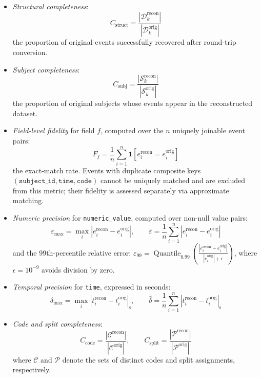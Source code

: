 \begin{itemize}
	
	\item \emph{Structural completeness}:
	\[
	C_{\text{struct}} = \frac{|\mathcal{D}_k^{\text{recon}}|}{|\mathcal{D}_k^{\text{orig}}|}
	\]
	the proportion of original events successfully recovered after round-trip conversion.
	
	\item \emph{Subject completeness}:
	\[
	C_{\text{subj}} = \frac{|\mathcal{S}_k^{\text{recon}}|}{|\mathcal{S}_k^{\text{orig}}|}
	\]
	the proportion of original subjects whose events appear in the reconstructed dataset.
	
	\item \emph{Field-level fidelity} for field $f$, computed over the $n$ uniquely joinable event pairs:
	\[
	F_f = \frac{1}{n} \sum_{i=1}^{n} \mathbf{1}\!\left[e_i^{\text{recon}} = e_i^{\text{orig}}\right]
	\]
the exact-match rate. Events with duplicate composite keys $(\texttt{subject\_id},\allowbreak \texttt{time},\allowbreak \texttt{code})$ cannot be uniquely matched and are excluded from this metric; their fidelity is assessed separately via approximate matching.
	
	\item \emph{Numeric precision} for \texttt{numeric\_value}, computed over non-null value pairs:
	\[
	\varepsilon_{\max} = \max_i \left| e_i^{\text{recon}} - e_i^{\text{orig}} \right|, \qquad
	\bar{\varepsilon} = \frac{1}{n} \sum_{i=1}^{n} \left| e_i^{\text{recon}} - e_i^{\text{orig}} \right|
	\]
	and the 99th-percentile relative error: \break $\varepsilon_{99} = \operatorname{Quantile}_{0.99}\!\left(\frac{|e_i^{\text{recon}} - e_i^{\text{orig}}|}{|e_i^{\text{orig}}| + \epsilon}\right)$, where $\epsilon = 10^{-9}$ avoids division by zero.
	
	\item \emph{Temporal precision} for \texttt{time}, expressed in seconds:
	\[
	\delta_{\max} = \max_i \left| t_i^{\text{recon}} - t_i^{\text{orig}} \right|_{\text{s}}, \qquad
	\bar{\delta} = \frac{1}{n} \sum_{i=1}^{n} \left| t_i^{\text{recon}} - t_i^{\text{orig}} \right|_{\text{s}}
	\]
	
	\item \emph{Code and split completeness}:
	\[
	C_{\text{code}} = \frac{|\mathcal{C}^{\text{recon}}|}{|\mathcal{C}^{\text{orig}}|}, \qquad
	C_{\text{split}} = \frac{|\mathcal{P}^{\text{recon}}|}{|\mathcal{P}^{\text{orig}}|}
	\]
	where $\mathcal{C}$ and $\mathcal{P}$ denote the sets of distinct codes and split assignments, respectively.
\end{itemize}

